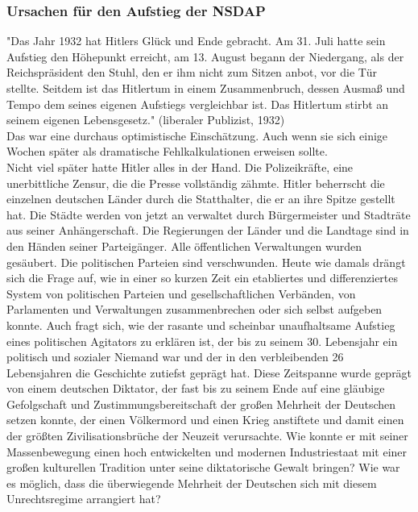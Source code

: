 \documentclass[letterpaper, 12pt]{article}
\let\tempsubsubsection\subsubsection
\renewcommand\subsubsection[1]{\vspace{0cm}\tempsubsubsection{#1}\vspace{0cm}}
\begin{document}
\subsubsection{Ursachen für den Aufstieg der NSDAP}

"Das Jahr 1932 hat Hitlers Glück und Ende gebracht. Am 31. Juli hatte sein Aufstieg den Höhepunkt erreicht, am 13. August begann der Niedergang, als der Reichspräsident den Stuhl, den er ihm nicht zum Sitzen anbot, vor die Tür stellte. Seitdem ist das Hitlertum in einem Zusammenbruch, dessen Ausmaß und Tempo dem seines eigenen Aufstiegs vergleichbar ist. Das Hitlertum stirbt an seinem eigenen Lebensgesetz." (liberaler Publizist, 1932)\\
Das war eine durchaus optimistische Einschätzung. Auch wenn sie sich einige Wochen später als dramatische Fehlkalkulationen erweisen sollte. \\
Nicht viel später hatte Hitler alles in der Hand. Die Polizeikräfte, eine unerbittliche Zensur, die die Presse vollständig zähmte. Hitler beherrscht die einzelnen deutschen Länder durch die Statthalter, die er an ihre Spitze gestellt hat. Die Städte werden von jetzt an verwaltet durch Bürgermeister und Stadträte aus seiner Anhängerschaft. Die Regierungen der Länder und die Landtage sind in den Händen seiner Parteigänger. Alle öffentlichen Verwaltungen wurden gesäubert. Die politischen Parteien sind verschwunden. \clearpage
Heute wie damals drängt sich die Frage auf, wie in einer so kurzen Zeit ein etabliertes und differenziertes System von politischen Parteien und gesellschaftlichen Verbänden, von Parlamenten und Verwaltungen zusammenbrechen oder sich selbst aufgeben konnte. Auch fragt sich, wie der rasante und scheinbar unaufhaltsame Aufstieg eines politischen Agitators zu erklären ist, der bis zu seinem 30. Lebensjahr ein politisch und sozialer Niemand war und der in den verbleibenden 26 Lebensjahren die Geschichte zutiefst geprägt hat. Diese Zeitspanne wurde geprägt von einem deutschen Diktator, der fast bis zu seinem Ende auf eine gläubige Gefolgschaft und Zustimmungsbereitschaft der großen Mehrheit der Deutschen setzen konnte, der einen Völkermord und einen Krieg anstiftete und damit einen der größten Zivilisationsbrüche der Neuzeit verursachte. Wie konnte er mit seiner Massenbewegung einen hoch entwickelten und modernen Industriestaat mit einer großen kulturellen Tradition unter seine diktatorische Gewalt bringen? Wie war es möglich, dass die überwiegende Mehrheit der Deutschen sich mit diesem Unrechtsregime arrangiert hat? \\
\end{document}
